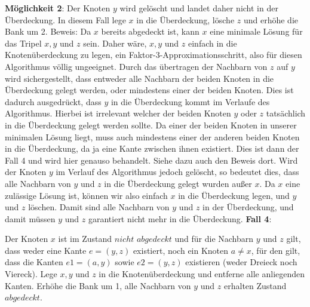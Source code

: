 \documentclass[12pt,onecolumn, notitlepage]{scrartcl}
\begin{document}
\textbf{Möglichkeit 2}:\newline
Der Knoten $y$ wird gelöscht und landet daher nicht in der Überdeckung. In diesem Fall lege $x$ in die Überdeckung, lösche $z$ und erhöhe die Bank um 2.
Beweis:\newline
Da $x$ bereits abgedeckt ist, kann $x$ eine minimale Lösung für das Tripel $x,y$ und $z$ sein. Daher wäre, $x,y$ und $z$ einfach in die Knotenüberdeckung zu legen, ein Faktor-3-Approximationsschritt, also für diesen Algorithmus völlig ungeeignet. Durch das übertragen der Nachbarn von $z$ auf $y$ wird sichergestellt, dass entweder alle Nachbarn der beiden Knoten in die Überdeckung gelegt werden, oder mindestens einer der beiden Knoten. Dies ist dadurch ausgedrückt, dass $y$ in die Überdeckung kommt im Verlaufe des Algorithmus. Hierbei ist irrelevant welcher der beiden Knoten $y$ oder $z$ tatsächlich in die Überdeckung gelegt werden sollte. Da einer der beiden Knoten in unserer minimalen Lösung liegt, muss auch mindestens einer der anderen beiden Knoten in die Überdeckung, da ja eine Kante zwischen ihnen existiert. Dies ist dann der Fall 4 und wird hier genauso behandelt. Siehe dazu auch den Beweis dort.
Wird der Knoten $y$ im Verlauf des Algorithmus jedoch gelöscht, so bedeutet dies, dass alle Nachbarn von $y$ und $z$ in die Überdeckung gelegt wurden außer $x$. Da $x$ eine zulässige Lösung ist, können wir also einfach $x$ in die Überdeckung legen, und $y$ und $z$ löschen. Damit sind alle Nachbarn von $y$ und $z$ in der Überdeckung, und damit müssen $y$ und $z$ garantiert nicht mehr in die Überdeckung.\newline \newline
\textbf{Fall 4}:\newline
\begin{center}
\end{center}
Der Knoten $x$ ist im Zustand $nicht$ $abgedeckt$ und für die Nachbarn $y$ und $z$ gilt, dass weder eine Kante $e = (y,z)$ existiert, noch ein Knoten $a \neq x$, für den gilt, dass die Kanten $e1 = (a,y)$ sowie $e2 = (y,z)$ existieren (weder Dreieck noch Viereck). Lege $x,y$ und $z$ in die Knotenüberdeckung und entferne alle anliegenden Kanten. Erhöhe die Bank um 1, alle Nachbarn von $y$ und $z$ erhalten Zustand $abgedeckt$. \newline
\end{document}
